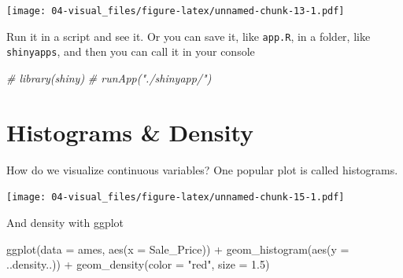 \documentclass[
]{book}
\newenvironment{Shaded}{\begin{snugshade}}{\end{snugshade}}
\newcommand{\AttributeTok}[1]{\textcolor[rgb]{0.77,0.63,0.00}{#1}}
\newcommand{\CommentTok}[1]{\textcolor[rgb]{0.56,0.35,0.01}{\textit{#1}}}
\newcommand{\FloatTok}[1]{\textcolor[rgb]{0.00,0.00,0.81}{#1}}
\newcommand{\FunctionTok}[1]{\textcolor[rgb]{0.00,0.00,0.00}{#1}}
\newcommand{\NormalTok}[1]{#1}
\newcommand{\SpecialCharTok}[1]{\textcolor[rgb]{0.00,0.00,0.00}{#1}}
\newcommand{\StringTok}[1]{\textcolor[rgb]{0.31,0.60,0.02}{#1}}
\begin{document}
\begin{Shaded}
\end{Shaded}

\texttt{[image: 04-visual\_files/figure-latex/unnamed-chunk-13-1.pdf]}

Run it in a script and see it. Or you can save it, like \texttt{app.R}, in a folder, like \texttt{shinyapps}, and then you can call it in your console

\begin{Shaded}
\begin{Highlighting}[]
\CommentTok{\# library(shiny)}
\CommentTok{\# runApp("./shinyapp/")}
\end{Highlighting}
\end{Shaded}

\hypertarget{histograms-density}{%
\section{Histograms \& Density}\label{histograms-density}}

How do we visualize continuous variables? One popular plot is called histograms.

\begin{Shaded}
\end{Shaded}

\texttt{[image: 04-visual\_files/figure-latex/unnamed-chunk-15-1.pdf]}

And density with ggplot

\begin{Shaded}
\begin{Highlighting}[]
\FunctionTok{ggplot}\NormalTok{(}\AttributeTok{data =}\NormalTok{ ames, }\FunctionTok{aes}\NormalTok{(}\AttributeTok{x =}\NormalTok{ Sale\_Price)) }\SpecialCharTok{+}
  \FunctionTok{geom\_histogram}\NormalTok{(}\FunctionTok{aes}\NormalTok{(}\AttributeTok{y =}\NormalTok{ ..density..)) }\SpecialCharTok{+}
  \FunctionTok{geom\_density}\NormalTok{(}\AttributeTok{color =} \StringTok{"red"}\NormalTok{,}
               \AttributeTok{size =} \FloatTok{1.5}\NormalTok{)}
\end{Highlighting}
\end{Shaded}
\end{document}

